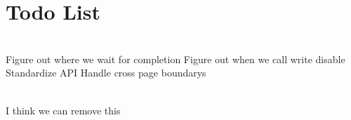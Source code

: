 \chapter{Todo List }
\hypertarget{todo}{}\label{todo}

\begin{DoxyRefList}
\item[Member \doxylink{classS25FL512_a81aac4f7bc78c0336b0b2e3a4dcb0519}{S25\+FL512\+::S25\+FL512} (uint8\+\_\+t chip\+Select\+Pin)]\hfill \\
\label{todo__todo000002}%
%
 Figure out where we wait for completion Figure out when we call write disable Standardize API Handle cross page boundary\textquotesingle{}s  
\item[Class \doxylink{classVolatileConfigurationMemory}{Volatile\+Configuration\+Memory\texorpdfstring{$<$}{<} N \texorpdfstring{$>$}{>}} ]\hfill \\
\label{todo__todo000001}%
%
I think we can remove this
\end{DoxyRefList}